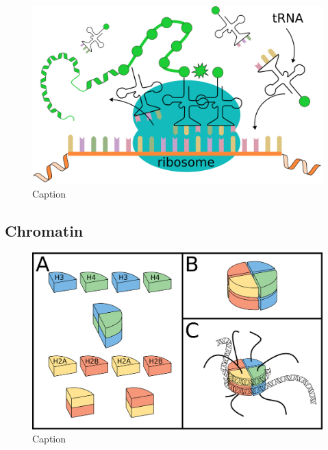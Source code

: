 \begin{figure}[H]
    \includegraphics[width=\linewidth]{ch1.Introduction/imgs/translation.png}
    \caption{Caption}
    \label{fig:translation}
\end{figure}

\subsection{Chromatin}

\begin{figure}[H]
    \includegraphics[width=\linewidth]{ch1.Introduction/imgs/histones.png}
    \caption{Caption}
    \label{fig:histones}
\end{figure}

